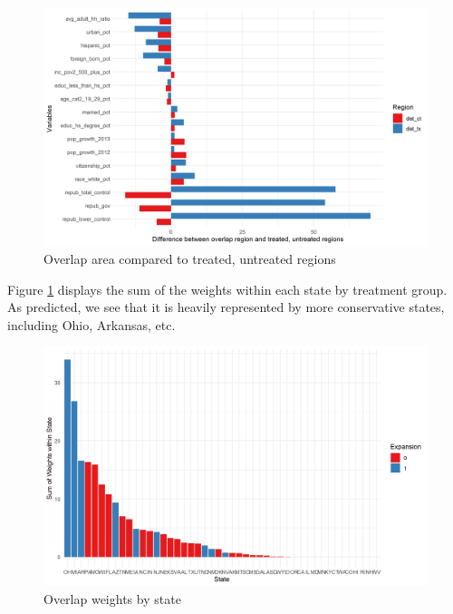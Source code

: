 \documentclass[12pt]{article}
\begin{document}
\begin{figure}[]
\begin{center}
    \includegraphics[scale=0.6]{01_Plots/oate-imbalances.png}
    \caption{Overlap area compared to treated, untreated regions}
    \label{oateimbalance}
\end{center}
\end{figure}

Figure \ref{oateimbalance} displays the sum of the weights within each state by treatment group. As predicted, we see that it is heavily represented by more conservative states, including Ohio, Arkansas, etc.

\begin{figure}[]
\begin{center}
    \includegraphics[scale=0.6]{01_Plots/oate-region.png}
    \caption{Overlap weights by state}
    \label{oatearea}
\end{center}
\end{figure}
\end{document}
